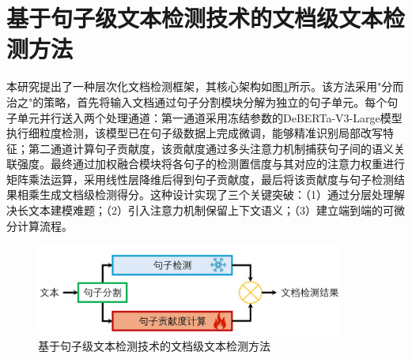 



\section{基于句子级文本检测技术的文档级文本检测方法}
\label{sec:method-sent2arti}

本研究提出了一种层次化文档检测框架，其核心架构如图\ref{fig:method-sent2arti}所示。该方法采用"分而治之"的策略，首先将输入文档通过句子分割模块分解为独立的句子单元。每个句子单元并行送入两个处理通道：第一通道采用冻结参数的DeBERTa-V3-Large模型执行细粒度检测，该模型已在句子级数据上完成微调，能够精准识别局部改写特征；第二通道计算句子贡献度，该贡献度通过多头注意力机制捕获句子间的语义关联强度。最终通过加权融合模块将各句子的检测置信度与其对应的注意力权重进行矩阵乘法运算，采用线性层降维后得到句子贡献度，最后将该贡献度与句子检测结果相乘生成文档级检测得分。这种设计实现了三个关键突破：（1）通过分层处理解决长文本建模难题；（2）引入注意力机制保留上下文语义；（3）建立端到端的可微分计算流程。

\begin{figure}[htbp]
    \centering
    \includegraphics[width=0.9\textwidth]{figures/sent2arti.jpg}
    \caption{基于句子级文本检测技术的文档级文本检测方法}
    \label{fig:method-sent2arti}
\end{figure}

